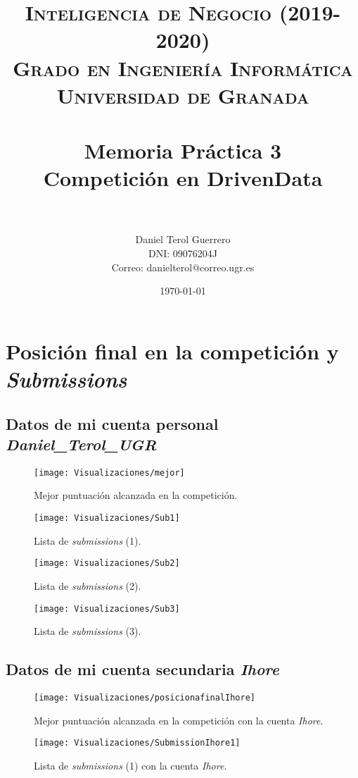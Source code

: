 \documentclass[paper=a4, fontsize=12pt]{article} %
\title{ 
\normalfont \normalsize 
\textsc{{\bf Inteligencia de Negocio (2019-2020)} \\ Grado en Ingeniería Informática \\ Universidad de Granada} \\ [25pt] %
\horrule{0.5pt} \\[0.4cm] %
\huge Memoria Práctica 3 \\ Competición en DrivenData\\%
\horrule{2pt} \\[0.5cm] %
}
\author{Daniel Terol Guerrero\\DNI: 09076204J\\Correo: danielterol@correo.ugr.es} %
\date{\normalsize\today} %
\numberwithin{equation}{section} %
\numberwithin{figure}{section} %
\numberwithin{table}{section} %
\begin{document}
\maketitle %
\newpage %

\section{Posición final en la competición y \textit{Submissions}}	
\subsection{Datos de mi cuenta personal \textit{Daniel\_Terol\_UGR}}
\begin{figure}[H]
  \centering
  \texttt{[image: Visualizaciones/mejor]}
  \caption{Mejor puntuación alcanzada en la competición.}
  \label{mejor}
\end{figure}

\begin{figure}[H]
  \centering
  \texttt{[image: Visualizaciones/Sub1]}
  \caption{Lista de \textit{submissions} (1).}
  \label{sub1}
\end{figure}

\begin{figure}[H]
  \centering
  \texttt{[image: Visualizaciones/Sub2]}
  \caption{Lista de \textit{submissions} (2).}
  \label{sub2}
\end{figure}

\begin{figure}[H]
  \centering
  \texttt{[image: Visualizaciones/Sub3]}
  \caption{Lista de \textit{submissions} (3).}
  \label{sub3}
\end{figure}

\subsection{Datos de mi cuenta secundaria \textit{Ihore}}
\begin{figure}[H]
  \centering
  \texttt{[image: Visualizaciones/posicionafinalIhore]}
  \caption{Mejor puntuación alcanzada en la competición con la cuenta \textit{Ihore}.}
  \label{mejor}
\end{figure}

\begin{figure}[H]
  \centering
  \texttt{[image: Visualizaciones/SubmissionIhore1]}
  \caption{Lista de \textit{submissions} (1) con la cuenta \textit{Ihore}.}
  \label{subI1}
\end{figure}
\end{document}
